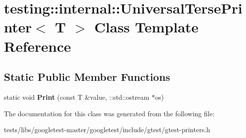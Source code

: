 \hypertarget{classtesting_1_1internal_1_1UniversalTersePrinter}{}\section{testing\+:\+:internal\+:\+:Universal\+Terse\+Printer$<$ T $>$ Class Template Reference}
\label{classtesting_1_1internal_1_1UniversalTersePrinter}
\subsection*{Static Public Member Functions}
\begin{DoxyCompactItemize}
\item 
\mbox{\label{classtesting_1_1internal_1_1UniversalTersePrinter_a042249cdb42fdb77588c9ad54ea7ed54}} 
static void {\bfseries Print} (const T \&value, \+::std\+::ostream $\ast$os)
\end{DoxyCompactItemize}


The documentation for this class was generated from the following file\+:\begin{DoxyCompactItemize}
\item 
tests/libs/googletest-\/master/googletest/include/gtest/gtest-\/printers.\+h\end{DoxyCompactItemize}
